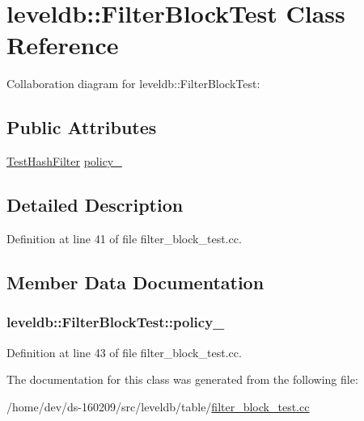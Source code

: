\hypertarget{classleveldb_1_1_filter_block_test}{}\section{leveldb\+:\+:Filter\+Block\+Test Class Reference}
\label{classleveldb_1_1_filter_block_test}


Collaboration diagram for leveldb\+:\+:Filter\+Block\+Test\+:
\subsection*{Public Attributes}
\begin{DoxyCompactItemize}
\item 
\hyperlink{classleveldb_1_1_test_hash_filter}{Test\+Hash\+Filter} \hyperlink{classleveldb_1_1_filter_block_test_ae52fe0fab92f8efc0c078b117cf43e67}{policy\+\_\+}
\end{DoxyCompactItemize}


\subsection{Detailed Description}


Definition at line 41 of file filter\+\_\+block\+\_\+test.\+cc.



\subsection{Member Data Documentation}
\hypertarget{classleveldb_1_1_filter_block_test_ae52fe0fab92f8efc0c078b117cf43e67}{}
\subsubsection[{policy\+\_\+}]{ leveldb\+::\+Filter\+Block\+Test\+::policy\+\_\+}\label{classleveldb_1_1_filter_block_test_ae52fe0fab92f8efc0c078b117cf43e67}


Definition at line 43 of file filter\+\_\+block\+\_\+test.\+cc.



The documentation for this class was generated from the following file\+:\begin{DoxyCompactItemize}
\item 
/home/dev/ds-\/160209/src/leveldb/table/\hyperlink{filter__block__test_8cc}{filter\+\_\+block\+\_\+test.\+cc}\end{DoxyCompactItemize}

